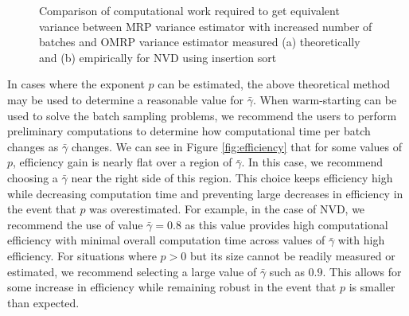\documentclass[12pt]{article}
\newcommand{\gammab}{\bar{\gamma}}
\begin{document}
\begin{figure}[htb!]
	\centering
		\caption{
		Comparison of computational work required to get equivalent variance between MRP variance estimator with increased number of batches and OMRP variance estimator measured
		(a) theoretically and 
		(b) empirically for NVD using insertion sort
		}
\label{fig:comp_work_comparison}
\end{figure}


In cases where the exponent $p$ can be estimated, the above theoretical method may be used to determine a reasonable value for $\gammab$.
When warm-starting can be used to solve the batch sampling problems, we recommend the users to perform preliminary computations to determine how computational time per batch changes as $\gammab$ changes. 
We can see in Figure \ref{fig:efficiency} that for some values of $p$, efficiency gain is nearly flat over a region of $\gammab$.
In this case, we recommend choosing a $\gammab$ near the right side of this region.
This choice keeps efficiency high while decreasing computation time and preventing large decreases in efficiency in the event that $p$ was overestimated.
For example, in the case of NVD, we recommend the use of value $\gammab=0.8$ as this value provides high computational efficiency with minimal overall computation time across values of $\gammab$ with high efficiency. 
For situations where $p > 0$ but its size cannot be readily measured or estimated, we recommend selecting a large value of $\gammab$ such as $0.9$.
This allows for some increase in efficiency while remaining robust in the event that $p$ is smaller than expected.
\end{document}
